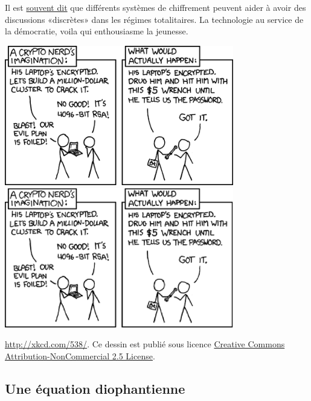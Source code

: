 Il est \href{https://www.torproject.org/about/torusers.html.en#activists}{souvent dit} que différents systèmes de chiffrement peuvent aider à avoir des discussions «discrètes» dans les régimes totalitaires. La technologie au service de la démocratie, voila qui enthousiasme la jeunesse. 

\begin{center}
        \ifpdf
            \includegraphics[width=10cm]{security.png}
        \else
            \includegraphics[width=10cm]{security.eps}
        \fi

        \url{http://xkcd.com/538/}. Ce dessin est publié sous licence \href{http://creativecommons.org/licenses/by-nc/2.5/}{ Creative Commons Attribution-NonCommercial 2.5 License}.
\end{center}

\subsection{Une équation diophantienne}



